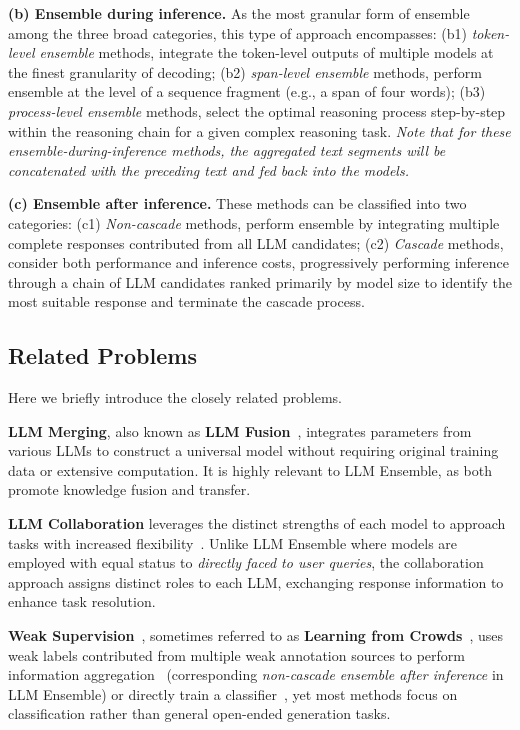 \documentclass{article}
\begin{document}
\textbf{(b) Ensemble during inference.}
As the most granular form of ensemble among the three broad categories, this type of approach encompasses: (b1) \textit{token-level ensemble} methods, integrate the token-level outputs of multiple models at the finest granularity of decoding;
(b2) \textit{span-level ensemble} methods, perform ensemble at the level of a sequence fragment (e.g., a span of four words); 
(b3) 
\textit{process-level ensemble} methods, select the optimal reasoning process step-by-step within the reasoning chain for a given complex reasoning task. 
\textit{Note that for these ensemble-during-inference methods, the aggregated text segments will be concatenated with the preceding text and fed back into the models.}


\textbf{(c) Ensemble after inference.}
These methods can be classified into two categories: 
(c1) \textit{Non-cascade} methods, perform ensemble by integrating multiple complete responses contributed from all LLM candidates;
(c2) \textit{Cascade} methods, consider both performance and inference costs, progressively performing inference through a chain of LLM candidates ranked primarily by model size to identify the most suitable response and terminate the cascade process.






\subsection{Related Problems}
Here we briefly introduce the closely related problems.

\textbf{LLM Merging}, also known as \textbf{LLM Fusion}~\cite{yang2024model,yang2025cabs,ruan2025task}, integrates parameters from various LLMs to construct a universal model without requiring original training data or extensive computation. 
It is highly relevant to LLM Ensemble, as both promote knowledge fusion and transfer.

\textbf{LLM  Collaboration} leverages the distinct strengths of each model to approach tasks with increased flexibility~\cite{du2023improving,lu2024merge,chen2025survey,tran2025multi,zhang2025if}. 
Unlike LLM Ensemble where models are employed with equal status to \textit{directly faced to user queries}, the collaboration approach assigns distinct roles to each LLM, exchanging response information to enhance task resolution.

\textbf{Weak Supervision}~\cite{zhang2021wrench,chen2023neural,zhang2022survey,ratner2017snorkel}, 
sometimes referred to as
\textbf{Learning from Crowds}~\cite{chen2021structured,chen2022adversarial,zhang2022knowledge}, uses weak labels contributed from multiple weak annotation sources to perform information aggregation~\cite{chen2023black,zheng2017truth} (corresponding \textit{non-cascade ensemble after inference} in LLM Ensemble) or directly train a classifier~\cite{zhang2021wrench}, yet most methods focus on classification
rather than general open-ended generation tasks.
\end{document}
